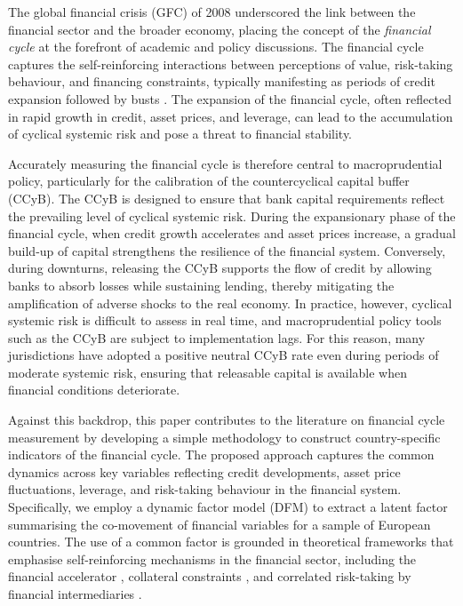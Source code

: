 The global financial crisis (GFC) of 2008 underscored the link between the financial sector and the broader economy, placing the concept of the \textit{financial cycle} at the forefront of academic and policy discussions. The financial cycle captures the self-reinforcing interactions between perceptions of value, risk-taking behaviour, and financing constraints, typically manifesting as periods of credit expansion followed by busts \citep{borio2014financial}. The expansion of the financial cycle, often reflected in rapid growth in credit, asset prices, and leverage, can lead to the accumulation of cyclical systemic risk and pose a threat to financial stability.

Accurately measuring the financial cycle is therefore central to macroprudential policy, particularly for the calibration of the countercyclical capital buffer (CCyB). The CCyB is designed to ensure that bank capital requirements reflect the prevailing level of cyclical systemic risk. During the expansionary phase of the financial cycle, when credit growth accelerates and asset prices increase, a gradual build-up of capital strengthens the resilience of the financial system. Conversely, during downturns, releasing the CCyB supports the flow of credit by allowing banks to absorb losses while sustaining lending, thereby mitigating the amplification of adverse shocks to the real economy. In practice, however, cyclical systemic risk is difficult to assess in real time, and macroprudential policy tools such as the CCyB are subject to implementation lags. For this reason, many jurisdictions have adopted a positive neutral CCyB rate even during periods of moderate systemic risk, ensuring that releasable capital is available when financial conditions deteriorate.

Against this backdrop, this paper contributes to the literature on financial cycle measurement by developing a simple methodology to construct country-specific indicators of the financial cycle. The proposed approach captures the common dynamics across key variables reflecting credit developments, asset price fluctuations, leverage, and risk-taking behaviour in the financial system. Specifically, we employ a dynamic factor model (DFM) to extract a latent factor summarising the co-movement of financial variables for a sample of European countries. The use of a common factor is grounded in theoretical frameworks that emphasise self-reinforcing mechanisms in the financial sector, including the financial accelerator \citet{bernanke1999financial}, collateral constraints \citet{kiyotaki1997credit}, and correlated risk-taking by financial intermediaries \citet{he2013intermediary}.

